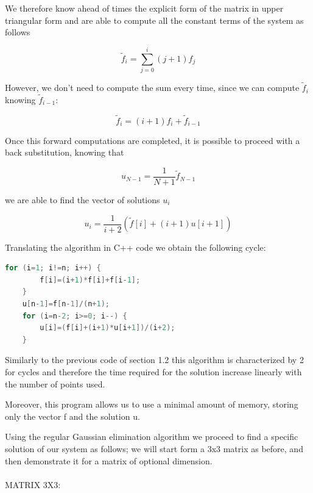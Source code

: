\documentclass {article}
\begin{document}
We therefore know ahead of times the explicit form of the matrix in upper triangular form and are able to compute all the constant terms of the system as follows

$$\tilde{f}_i= \sum_{j=0}^{i}(j+1) f_j$$

However, we don't need to compute the sum every time, since we can compute $\tilde{f}_i$ knowing $\tilde{f}_{i-1}$:

$$\tilde{f}_i=(i+1)f_i+\tilde{f}_{i-1}$$

Once this forward computations are completed, it is possible to proceed with a back substitution, knowing that

$$u_{N-1}=\frac{1}{N+1} \tilde{f}_{N-1}$$

we are able to find the vector of solutions $u_i$

$$u_i=\frac{1}{i+2} (\tilde{f}[i]+ (i+1) u[i+1])$$

Translating the algorithm in C++ code we obtain the following cycle:

\begin{lstlisting}[language=cpp]
	for (i=1; i!=n; i++) {
		f[i]=(i+1)*f[i]+f[i-1];
	}
	u[n-1]=f[n-1]/(n+1);
	for (i=n-2; i>=0; i--) {
		u[i]=(f[i]+(i+1)*u[i+1])/(i+2);
	}
\end{lstlisting}

Similarly to the previous code of section 1.2 this algorithm is characterized by 2 for cycles and therefore the time required for the solution increase linearly with the number of points used.

Moreover, this program allows us to use a minimal amount of memory, storing only the vector f and the solution u. 


Using the regular Gaussian elimination algorithm we proceed to find a specific solution of our system as follows; we will start form a 3x3 matrix as before, and then demonstrate it for a matrix of optional dimension.
\\
\\
MATRIX 3X3:
\end{document}
